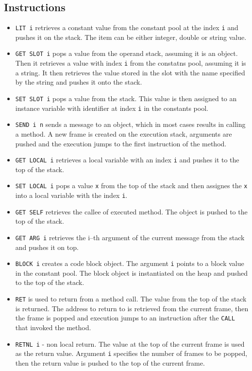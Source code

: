 \documentclass[thesis=M,english]{FITthesis}[2019/12/23]
\begin{document}
\subsection{Instructions}
\begin{itemize}
	\item \texttt{LIT i} retrieves a constant value from the constant pool at the index \texttt{i} and pushes it
		on the stack. The item can be either integer, double or string value.
	\item \texttt{GET SLOT i} pops a value from the operand stack, assuming it is an object. Then it retrieves a value
		with index \texttt{i} from the constatns pool, assuming it is a string. It then retrieves the value
		stored in the slot with the name specified by the string and pushes it onto the stack.
	\item \texttt{SET SLOT i} pops a value from the stack. This value is then assigned to an instance variable with identifier
		at index \texttt{i} in the constants pool.
	\item \texttt{SEND i n} sends a message to an object, which in most cases results in calling a method. A new frame
		is created on the execution stack, arguments are pushed and the execution jumps to the first instruction of the
		method.
	\item \texttt{GET LOCAL i} retrieves a local variable with an index \texttt{i} and pushes it to the top of the stack.
	\item \texttt{SET LOCAL i} pops a value \texttt{x} from the top of the stack and then assignes the \texttt{x} into
		a local variable with the index \texttt{i}.
	\item \texttt{GET SELF} retrieves the callee of executed method. The object is pushed to the top of the stack.
	\item \texttt{GET ARG i} retrieves the i--th argument of the current message from the stack and pushes it on top.
	\item \texttt{BLOCK i} creates a code block object. The argument \texttt{i} points to a block value in the constant pool.
		The block object is instantiated on the heap and pushed to the top of the stack.
	\item \texttt{RET} is used to return from a method call. The value from the top of the stack is returned. The address
		to return to is retrieved from the current frame, then the frame is popped and execution jumps to an instruction
		after the \texttt{CALL} that invoked the method.
	\item \texttt{RETNL i} - non local return. The value at the top of the current frame is used as the return value. Argument
		\texttt{i} specifies the number of frames to be popped, then the return value is pushed to the top of the current frame.
\end{itemize}
\end{document}
